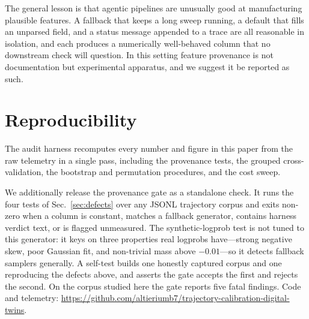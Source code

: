 \documentclass[conference]{IEEEtran}
\begin{document}
The general lesson is that agentic pipelines are unusually good at manufacturing
plausible features. A fallback that keeps a long sweep running, a default that
fills an unparsed field, and a status message appended to a trace are all
reasonable in isolation, and each produces a numerically well-behaved column
that no downstream check will question. In this setting feature provenance is
not documentation but experimental apparatus, and we suggest it be reported as
such.

\section*{Reproducibility}

The audit harness recomputes every number and figure in this paper from the raw
telemetry in a single pass, including the provenance tests, the grouped
cross-validation, the bootstrap and permutation procedures, and the cost sweep.

We additionally release the provenance gate as a standalone check. It runs the
four tests of Sec.~\ref{sec:defects} over any JSONL trajectory corpus and exits
non-zero when a column is constant, matches a fallback generator, contains
harness verdict text, or is flagged unmeasured. The synthetic-logprob test is
not tuned to this generator: it keys on three properties real logprobs
have---strong negative skew, poor Gaussian fit, and non-trivial mass above
$-0.01$---so it detects fallback samplers generally. A self-test builds one
honestly captured corpus and one reproducing the defects above, and asserts the
gate accepts the first and rejects the second. On the corpus studied here the
gate reports five fatal findings. Code and telemetry:
\url{https://github.com/altieriumb7/trajectory-calibration-digital-twins}.
\end{document}
